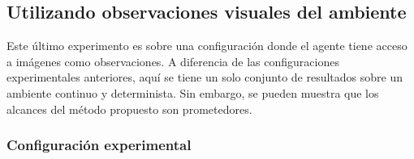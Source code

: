 


\newpage

\subsection{Utilizando observaciones visuales del ambiente}

Este último experimento es sobre una configuración donde el agente 
tiene acceso a imágenes como observaciones. A diferencia de las
configuraciones experimentales anteriores, aquí se tiene un solo conjunto
de resultados sobre un ambiente continuo y determinista. Sin embargo, 
se pueden muestra que los alcances del método propuesto son prometedores.

\subsubsection{Configuración experimental}

